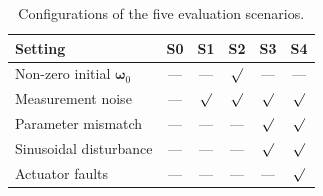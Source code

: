 \documentclass[a4paper,11pt]{article}
\begin{document}
\begin{table}[htbp]
\centering
\caption{Configurations of the five evaluation scenarios.}
\label{tab:scenario_settings}
\begin{tabular}{lccccc}
\toprule
\textbf{Setting}  & \textbf{S0} & \textbf{S1} & \textbf{S2} & \textbf{S3} & \textbf{S4} \\
\midrule
Non-zero initial $\bm{\omega}_0$ & --- & --- & $\surd$ & --- & --- \\
Measurement noise       & --- & $\surd$ & $\surd$ & $\surd$ & $\surd$ \\
Parameter mismatch      & --- & --- & --- & $\surd$ & $\surd$ \\
Sinusoidal disturbance  & --- & --- & --- & $\surd$ & $\surd$ \\
Actuator faults         & --- & --- & --- & --- & $\surd$ \\
\bottomrule
\end{tabular}
\end{table}
\end{document}
